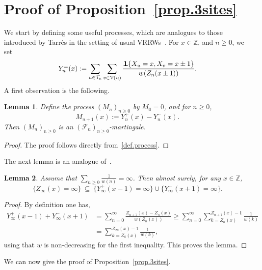\documentclass[11pt]{article}
\newtheorem {lem} {Lemma} [section]
\newcommand{\1}{{\text{\Large $\mathfrak 1$}}}
\begin{document}
\section{Proof of Proposition~\ref{prop.3sites}} \label{sec:3sites}
We start by defining some useful processes, which are analogues to those introduced by Tarr\`es in the setting of usual VRRWs~\cite{T1,T2}. 
For $x\in \mathbb Z$, and $n\ge 0$, we set  
$$Y_n^\pm(x) := \sum_{u\in \mathcal T_n} \sum_{v\in\mathcal V(u)} \frac{\1\{X_u = x, X_v = x\pm 1\}}{w(Z_n(x\pm 1))}.$$
A first observation is the following. 
\begin{lem}\label{lem:martingale}
Define the process $(M_n)_{n\ge 0}$ by $M_0=0$, and for $n\ge 0$, 
$$M_{n+1}(x) := Y_n^+(x) - Y_n^-(x).$$
Then $(M_n)_{n\ge 0}$ is an $(\mathcal F_n)_{n\ge 0}$-martingale. 
\end{lem}
\begin{proof} The proof follows directly from~\eqref{def.process}. 
\end{proof} 
The next lemma is an analogue of~\cite[Corollary 2.1]{T2}. 

\begin{lem}\label{lem:Ypm}
Assume that $\sum_{n\ge 0} \tfrac 1{w(n)}=\infty$. Then almost surely, for any $x\in \mathbb Z$, 
$$\{Z_\infty(x)=\infty\}\ \subseteq\  \{Y_\infty^+(x-1)=\infty\} \cup \{ Y_\infty^-(x+1)=\infty\}.$$ 
\end{lem}
\begin{proof} By definition one has, 
\begin{align*}
 Y_\infty^+(x-1) + Y_\infty^-(x+1) & = \sum_{n=0}^\infty \frac{Z_{n+1}(x) - Z_n(x)}{w(Z_n(x))}\ge \sum_{n=0}^\infty \sum_{k=Z_n(x)}^{Z_{n+1}(x)-1} \frac 1{w(k)} \\
 & = \sum_{k=Z_0(x)}^{Z_\infty(x)-1}\frac 1{w(k)},
 \end{align*} 
using that $w$ is non-decreasing for the first inequality. This proves the lemma.
\end{proof}

We can now give the proof of Proposition~\ref{prop.3sites}. 
\end{document}
